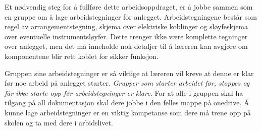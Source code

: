 
\vskip 10pt

Et nødvendig steg for å fullføre dette arbeidsoppdraget, er å jobbe sammen som en gruppe om å lage arbeidstegninger for anlegget. Arbeidstegningene består som regel av arrangementstegning, skjema over elektriske koblinger og sløyfeskjema over eventuelle instrumentsløyfer. Dette trenger ikke være komplette tegninger over anlegget, men det må inneholde nok detaljer til å læreren kan avgjøre om komponentene blir rett koblet for sikker funksjon.





Gruppen sine arbeidstegninger er så viktige at læreren vil kreve at denne er klar før noe arbeid på anlegget starter. \textit{Grupper som starter arbeidet før, stoppes og får ikke starte opp før arbeidstegninger er klare.  } For at alle i gruppen skal ha tilgang på all dokumentasjon skal dere jobbe i den felles mappe på onedrive. Å kunne lage arbeidstegninger er en viktig kompetanse som dere må trene opp på skolen og ta med dere i arbidslivet.  


